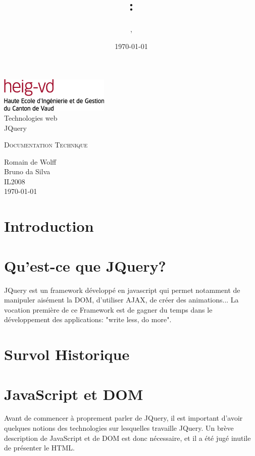 \documentclass[10pt,a4paper,titlepage]{article}
\author{\auteurOne, \auteurTwo}
\title{\branchetag : \laboname}
\date{\today}
\newcommand{\branche}{Technologies web}
\newcommand{\laboname}{JQuery}
\newcommand{\auteurOne}{Romain de Wolff}
\newcommand{\auteurTwo}{Bruno da Silva}
\newcommand{\promo}{IL2008}
\begin{document}
\pagestyle{headings}
\begin{titlepage}
	\begin{center}
	\includegraphics{img/logo-HEIG-VD.jpg}\\
		\vspace{3cm}
		\LARGE \branche %
		\vspace{3cm}\\
		\Huge \laboname \\
		\vspace{3cm}

		\Large \textsc{Documentation Technique} \\
		\vspace{3cm}

		\large \auteurOne \\
		\auteurTwo \\	
		\vspace{10pt}
		\normalsize \textsc{\promo} \\

		\vspace{3cm}
		\today
	\end{center}
\end{titlepage}

\tableofcontents
\newpage
\pagestyle{fancy}
\section{Introduction}


\newpage
\section{Qu'est-ce que JQuery?}
JQuery est un framework développé en javascript qui permet notamment de manipuler aisément la DOM, d'utiliser AJAX, de créer des animations...
La vocation première de ce Framework est de gagner du temps dans le développement des applications: "write less, do more".
\newpage
\section{Survol Historique}

\section{JavaScript et DOM}
Avant de commencer à proprement parler de JQuery, il est important d'avoir quelques notions des technologies sur lesquelles travaille JQuery. Un brève description de JavaScript et de DOM est donc nécessaire, et il a été jugé inutile de présenter le HTML.
\end{document}
